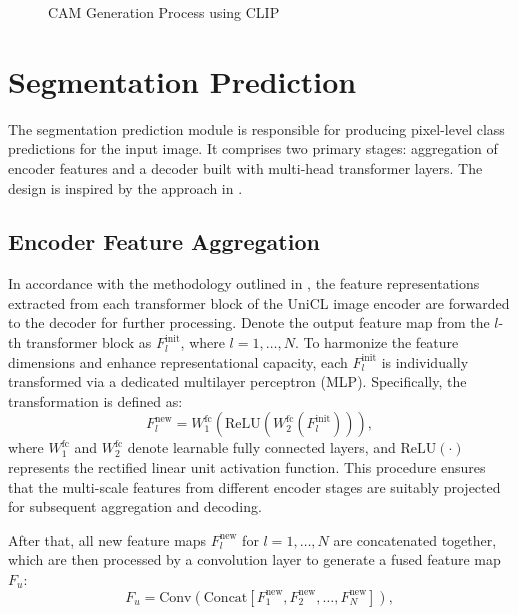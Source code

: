 \begin{figure}[htbp]
    \centering
    \caption{CAM Generation Process using CLIP}
    \label{fig:cam_generation_process_clip}
\end{figure}

\section{Segmentation Prediction}
\label{sec:segmentation_prediction}
The segmentation prediction module is responsible for producing pixel-level class predictions for the input image. It comprises two primary stages: aggregation of encoder features and a decoder built with multi-head transformer layers. The design is inspired by the approach in \cite{wsss_frozen_clip}.

\subsection{Encoder Feature Aggregation}
\label{subsec:en_feature_agg}
In accordance with the methodology outlined in \cite{wsss_frozen_clip}, the feature representations extracted from each transformer block of the UniCL image encoder \cite{vl_unicl} are forwarded to the decoder for further processing. Denote the output feature map from the $l$-th transformer block as \( F_l^{\text{init}} \), where \( l = 1, \dots, N \). To harmonize the feature dimensions and enhance representational capacity, each \( F_l^{\text{init}} \) is individually transformed via a dedicated multilayer perceptron (MLP). Specifically, the transformation is defined as:
\begin{equation}
    F_l^{\text{new}} = W_{1}^{\text{fc}} \left( \text{ReLU} \left( W_{2}^{\text{fc}}(F_l^{\text{init}}) \right) \right),
\end{equation}
where \( W_{1}^{\text{fc}} \) and \( W_{2}^{\text{fc}} \) denote learnable fully connected layers, and \(\text{ReLU}(\cdot)\) represents the rectified linear unit activation function. This procedure ensures that the multi-scale features from different encoder stages are suitably projected for subsequent aggregation and decoding.


After that, all new feature maps \( F_l^{\text{new}} \) for \( l = 1, \dots, N \) are concatenated together, which are then processed by a convolution layer to generate a fused feature map \( F_u \):
\begin{equation}
    F_u = \text{Conv}\left( \text{Concat}\left[ F_1^{\text{new}}, F_2^{\text{new}}, \dots, F_N^{\text{new}} \right] \right),
    \tag{2}
\end{equation}

